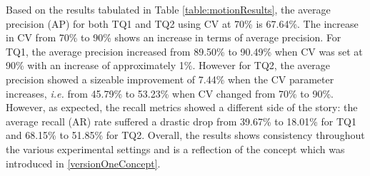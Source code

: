 \begin{table}[tb!]
\centering
\caption{Results of Motion Retrieval Task with Varying Confidence Value and
  Number of Atom Inputs}
\label{table:motionResults}
\vspace{0.5em}
\end{table}

Based on the results tabulated in Table \ref{table:motionResults}, the average
precision (AP) for both TQ1 and TQ2 using CV at 70\% is 67.64\%. The increase in CV from 70\% to 90\% shows an increase in terms of average precision. For TQ1, the
average precision increased from 89.50\% to 90.49\% when CV was set at 90\%
with an increase of approximately 1\%. However for TQ2, the average
precision showed a sizeable improvement of 7.44\% when the CV parameter increases, \emph{i.e.} from 45.79\% to 53.23\% when CV changed from 70\% to 90\%.
However, as expected, the recall metrics showed a different side of the story: the average recall (AR) rate suffered a drastic drop from 39.67\% to 18.01\%
for TQ1 and 68.15\% to 51.85\% for TQ2. Overall, the results shows consistency
throughout the various experimental settings and is a reflection of the concept which was introduced in \ref{versionOneConcept}.

